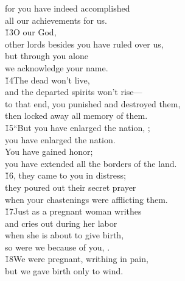 \begin{poetry}
\poemll    for you have indeed accomplished \\
\poemlll       all our achievements for us. \\
\poeml \v{13}O  our God, \\
\poemll    other lords besides you have ruled over us, \\
\poeml but through you alone \\
\poemll    we acknowledge your name. \\
\poeml \v{14}The dead won't live, \\
\poemll    and the departed spirits won't rise--- \\
\poeml to that end, you punished and destroyed them, \\
\poemll    then locked away all memory of them. \\
\poeml \v{15}``But you have enlarged the nation, ; \\
\poemll    you have enlarged the nation. \\
\poeml You have gained honor; \\
\poemll    you have extended all the borders of the land. \\
\poeml \v{16}, they came to you in distress; \\
\poemll    they poured out their secret prayer \\
\poemlll       when your chastenings were afflicting them. \\
\poeml \v{17}Just as a pregnant woman writhes \\
\poemll    and cries out during her labor \\
\poeml when she is about to give birth, \\
\poemll    so were we because of you, . \\
\poeml \v{18}We were pregnant, writhing in pain, \\
\poemll    but we gave birth only to wind. \\

\end{poetry}
